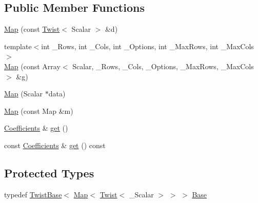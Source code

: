 \subsection*{Public Member Functions}
\begin{DoxyCompactItemize}
\item 
\hyperlink{class_map_3_01_twist_3_01___scalar_01_4_00_01_map_options_00_01_stride_type_01_4_a7bc49d9365cdda555f4d107d55a1c6b2}{Map} (const \hyperlink{class_twist}{Twist}$<$ Scalar $>$ \&d)
\item 
{\footnotesize template$<$int \+\_\+\+Rows, int \+\_\+\+Cols, int \+\_\+\+Options, int \+\_\+\+Max\+Rows, int \+\_\+\+Max\+Cols$>$ }\\\hyperlink{class_map_3_01_twist_3_01___scalar_01_4_00_01_map_options_00_01_stride_type_01_4_a469bc8175fab999f31a1c38c88fdd47b}{Map} (const Array$<$ Scalar, \+\_\+\+Rows, \+\_\+\+Cols, \+\_\+\+Options, \+\_\+\+Max\+Rows, \+\_\+\+Max\+Cols $>$ \&g)
\item 
\hyperlink{class_map_3_01_twist_3_01___scalar_01_4_00_01_map_options_00_01_stride_type_01_4_a7bd37d5ef0abea2b92aaae685fd38e69}{Map} (Scalar $\ast$data)
\item 
\hyperlink{class_map_3_01_twist_3_01___scalar_01_4_00_01_map_options_00_01_stride_type_01_4_a8f9f7e5bc9955feeebb7b9bc5fb783be}{Map} (const Map \&m)
\item 
\hyperlink{class_map_3_01_twist_3_01___scalar_01_4_00_01_map_options_00_01_stride_type_01_4_aed5862495c86340dcb689412d79eb66a}{Coefficients} \& \hyperlink{class_map_3_01_twist_3_01___scalar_01_4_00_01_map_options_00_01_stride_type_01_4_a53ade1199e68bed6af76d750b17a86b1}{get} ()
\item 
const \hyperlink{class_map_3_01_twist_3_01___scalar_01_4_00_01_map_options_00_01_stride_type_01_4_aed5862495c86340dcb689412d79eb66a}{Coefficients} \& \hyperlink{class_map_3_01_twist_3_01___scalar_01_4_00_01_map_options_00_01_stride_type_01_4_a6d725b7694668b1cd73c37cd6e1794ef}{get} () const
\end{DoxyCompactItemize}
\subsection*{Protected Types}
\begin{DoxyCompactItemize}
\item 
typedef \hyperlink{class_twist_base}{Twist\+Base}$<$ \hyperlink{class_map_3_01_twist_3_01___scalar_01_4_00_01_map_options_00_01_stride_type_01_4_a7bc49d9365cdda555f4d107d55a1c6b2}{Map}$<$ \hyperlink{class_twist}{Twist}$<$ \+\_\+\+Scalar $>$ $>$ $>$ \hyperlink{class_map_3_01_twist_3_01___scalar_01_4_00_01_map_options_00_01_stride_type_01_4_a1d92d7e062d98f16684181244775ea6c}{Base}
\end{DoxyCompactItemize}

